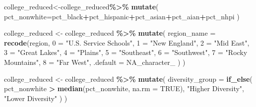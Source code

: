 \documentclass[
]{article}
\newenvironment{Shaded}{\begin{snugshade}}{\end{snugshade}}
\newcommand{\AttributeTok}[1]{\textcolor[rgb]{0.13,0.29,0.53}{#1}}
\newcommand{\ConstantTok}[1]{\textcolor[rgb]{0.56,0.35,0.01}{#1}}
\newcommand{\FunctionTok}[1]{\textcolor[rgb]{0.13,0.29,0.53}{\textbf{#1}}}
\newcommand{\NormalTok}[1]{#1}
\newcommand{\OtherTok}[1]{\textcolor[rgb]{0.56,0.35,0.01}{#1}}
\newcommand{\SpecialCharTok}[1]{\textcolor[rgb]{0.81,0.36,0.00}{\textbf{#1}}}
\newcommand{\StringTok}[1]{\textcolor[rgb]{0.31,0.60,0.02}{#1}}
\begin{document}
\begin{Shaded}
\begin{Highlighting}[]
\NormalTok{college\_reduced}\OtherTok{\textless{}{-}}\NormalTok{college\_reduced}\SpecialCharTok{\%\textgreater{}\%}
\FunctionTok{mutate}\NormalTok{(}
  \AttributeTok{pct\_nonwhite=}\NormalTok{pct\_black}\SpecialCharTok{+}\NormalTok{pct\_hispanic}\SpecialCharTok{+}\NormalTok{pct\_asian}\SpecialCharTok{+}\NormalTok{pct\_aian}\SpecialCharTok{+}\NormalTok{pct\_nhpi}
\NormalTok{)}
\end{Highlighting}
\end{Shaded}

\begin{Shaded}
\begin{Highlighting}[]
\NormalTok{college\_reduced }\OtherTok{\textless{}{-}}\NormalTok{ college\_reduced }\SpecialCharTok{\%\textgreater{}\%}
  \FunctionTok{mutate}\NormalTok{(}
    \AttributeTok{region\_name =} \FunctionTok{recode}\NormalTok{(region,}
      \StringTok{\textasciigrave{}}\AttributeTok{0}\StringTok{\textasciigrave{}} \OtherTok{=} \StringTok{"U.S. Service Schools"}\NormalTok{,}
      \StringTok{\textasciigrave{}}\AttributeTok{1}\StringTok{\textasciigrave{}} \OtherTok{=} \StringTok{"New England"}\NormalTok{,}
      \StringTok{\textasciigrave{}}\AttributeTok{2}\StringTok{\textasciigrave{}} \OtherTok{=} \StringTok{"Mid East"}\NormalTok{,}
      \StringTok{\textasciigrave{}}\AttributeTok{3}\StringTok{\textasciigrave{}} \OtherTok{=} \StringTok{"Great Lakes"}\NormalTok{,}
      \StringTok{\textasciigrave{}}\AttributeTok{4}\StringTok{\textasciigrave{}} \OtherTok{=} \StringTok{"Plains"}\NormalTok{,}
      \StringTok{\textasciigrave{}}\AttributeTok{5}\StringTok{\textasciigrave{}} \OtherTok{=} \StringTok{"Southeast"}\NormalTok{,}
      \StringTok{\textasciigrave{}}\AttributeTok{6}\StringTok{\textasciigrave{}} \OtherTok{=} \StringTok{"Southwest"}\NormalTok{,}
      \StringTok{\textasciigrave{}}\AttributeTok{7}\StringTok{\textasciigrave{}} \OtherTok{=} \StringTok{"Rocky Mountains"}\NormalTok{,}
      \StringTok{\textasciigrave{}}\AttributeTok{8}\StringTok{\textasciigrave{}} \OtherTok{=} \StringTok{"Far West"}\NormalTok{,}
      \AttributeTok{.default =} \ConstantTok{NA\_character\_}
\NormalTok{    )}
\NormalTok{  )}
\end{Highlighting}
\end{Shaded}

\begin{Shaded}
\begin{Highlighting}[]
\NormalTok{college\_reduced }\OtherTok{\textless{}{-}}\NormalTok{ college\_reduced }\SpecialCharTok{\%\textgreater{}\%}
  \FunctionTok{mutate}\NormalTok{(}
    \AttributeTok{diversity\_group =} \FunctionTok{if\_else}\NormalTok{(}
\NormalTok{      pct\_nonwhite }\SpecialCharTok{\textgreater{}} \FunctionTok{median}\NormalTok{(pct\_nonwhite, }\AttributeTok{na.rm =} \ConstantTok{TRUE}\NormalTok{),}
      \StringTok{"Higher Diversity"}\NormalTok{,}
      \StringTok{"Lower Diversity"}
\NormalTok{    )}
\NormalTok{  )}
\end{Highlighting}
\end{Shaded}
\end{document}
